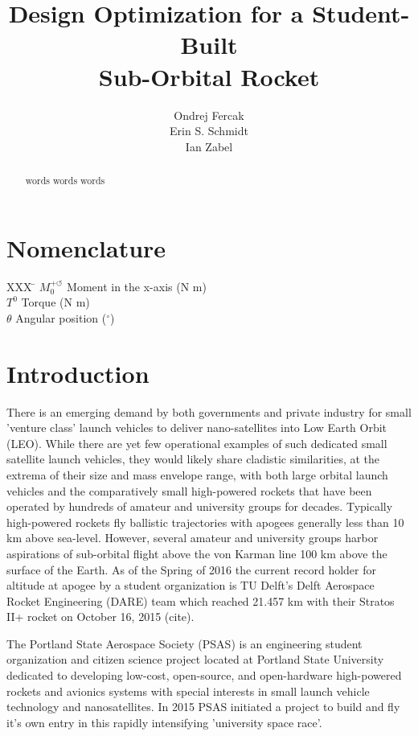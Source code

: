 \documentclass[]{aiaa-tc}%
\title{Design Optimization for a Student-Built \\ Sub-Orbital Rocket}
\author{
  Ondrej Fercak\\
  Erin S. Schmidt\\
  Ian Zabel\\  
 }
\begin{document}
\maketitle

\begin{abstract}
words words words
\end{abstract}

\section*{Nomenclature}

\begin{tabbing}
  XXX \= \kill%
  $M_0^{+ \circlearrowleft}$ \qquad Moment in the x-axis (N m)\\
  $T^0$ \qquad Torque (N m)\\
  $\theta$ \qquad Angular position (${}^{\circ}$)\\

 \end{tabbing}

\section{Introduction}
There is an emerging demand by both governments and private industry for small 'venture class' launch vehicles to deliver nano-satellites into Low Earth Orbit (LEO). While there are yet few operational examples of such dedicated small satellite launch vehicles, they would likely share cladistic similarities, at the extrema of their size and mass envelope range, with both large orbital launch vehicles and the comparatively small high-powered rockets that have been operated by hundreds of amateur and university groups for decades. Typically high-powered rockets fly ballistic trajectories with apogees generally less than 10 km above sea-level. However, several amateur and university groups harbor aspirations of sub-orbital flight above the von Karman line 100 km above the surface of the Earth. As of the Spring of 2016 the current record holder for altitude at apogee by a student organization is TU Delft's Delft Aerospace Rocket Engineering (DARE) team which reached 21.457 km with their Stratos II+ rocket on October 16, 2015 (cite).

The Portland State Aerospace Society (PSAS) is an engineering student organization and citizen science project located at Portland State University dedicated to developing low-cost, open-source, and open-hardware high-powered rockets and avionics systems with special interests in small launch vehicle technology and nanosatellites\cite{PSAS}. In 2015 PSAS initiated a project to build and fly it's own entry in this rapidly intensifying 'university space race'.
\end{document}
